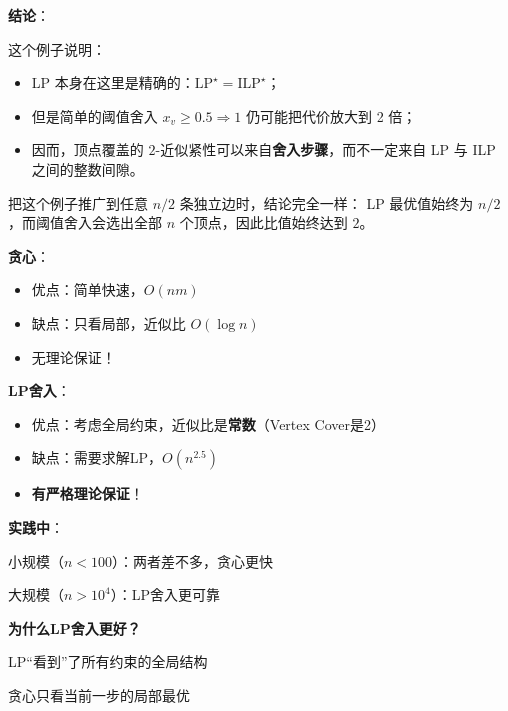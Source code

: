 \documentclass[12pt, a4paper]{ctexart}
\begin{document}
\begin{blackboard}
\textbf{结论}：

这个例子说明：
\begin{itemize}
    \item LP 本身在这里是精确的：$\mathrm{LP}^\star = \mathrm{ILP}^\star$；
    \item 但是简单的阈值舍入 $x_v \ge 0.5 \Rightarrow 1$ 仍可能把代价放大到 2 倍；
    \item 因而，顶点覆盖的 $2$-近似紧性可以来自\textbf{舍入步骤}，而不一定来自 LP 与 ILP 之间的整数间隙。
\end{itemize}

把这个例子推广到任意 $n/2$ 条独立边时，结论完全一样：
LP 最优值始终为 $n/2$，而阈值舍入会选出全部 $n$ 个顶点，因此比值始终达到 $2$。

\end{blackboard}

\begin{blackboard}

\textbf{贪心}：
\begin{itemize}
    \item 优点：简单快速，$O(nm)$
    \item 缺点：只看局部，近似比 $O(\log n)$
    \item 无理论保证！
\end{itemize}

\textbf{LP舍入}：
\begin{itemize}
    \item 优点：考虑全局约束，近似比是\textbf{常数}（Vertex Cover是2）
    \item 缺点：需要求解LP，$O(n^{2.5})$
    \item \textbf{有严格理论保证}！
\end{itemize}

\textbf{实践中}：

小规模（$n < 100$）：两者差不多，贪心更快

大规模（$n > 10^4$）：LP舍入更可靠

\textbf{为什么LP舍入更好？}

LP``看到''了所有约束的全局结构

贪心只看当前一步的局部最优

\end{blackboard}
\end{document}
